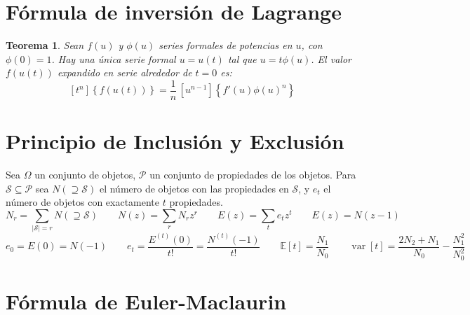 \documentclass[fleqn, spanish]{article}
\newtheorem*{theorem}{Teorema}
\newcommand{\E}{\mathbb{E}}
\DeclareMathOperator{\var}{var}
\begin{document}
\section*{Fórmula de inversión de Lagrange}
\label{sec:LIF}

\begin{theorem}
  Sean \(f(u)\) y \(\phi(u)\) series formales de potencias en \(u\),
  con \(\phi(0) = 1\).
  Hay una única serie formal \(u = u(t)\) tal que \(u = t \phi(u)\).
  El valor \(f(u(t))\) expandido en serie alrededor de \(t = 0\) es:
  \begin{equation*}
    \left[ t^n \right] \left\{ f(u(t)) \right\}
    = \frac{1}{n} \, \left[ u^{n - 1} \right]
    \left\{ f'(u) \phi(u)^n \right\}
  \end{equation*}
\end{theorem}

\section*{Principio de Inclusión y Exclusión}
\label{sec:PIE}

  Sea \(\Omega\) un conjunto de objetos,
  \(\mathcal{P}\) un conjunto de propiedades de los objetos.
  Para \(\mathcal{S} \subseteq \mathcal{P}\)
  sea \(N(\supseteq \mathcal{S})\) el número de objetos
  con las propiedades en \(\mathcal{S}\),
  y \(e_t\) el número de objetos con exactamente \(t\) propiedades.
  \begin{equation*}
    N_r
      = \sum_{\lvert \mathcal{S} \rvert = r} N(\supseteq{\mathcal{S}})
	 \qquad
    N(z)
      = \sum_r N_r z^r \qquad E(z) = \sum_t e_t z^t
	 \qquad
    E(z) = N(z - 1)
  \end{equation*}
  \begin{equation*}
    e_0
      = E(0)
      = N(-1)
    \qquad
    e_t
      = \frac{E^{(t)}(0)}{t!}
      = \frac{N^{(t)}(-1)}{t!}
    \qquad
    \E[t]
      = \frac{N_1}{N_0}
    \qquad
    \var[t]
      = \frac{2 N_2 + N_1}{N_0} - \frac{N_1^2}{N_0^2}
  \end{equation*}

\section*{Fórmula de Euler-Maclaurin}
\label{sec:Euler-Maclaurin}
\end{document}
